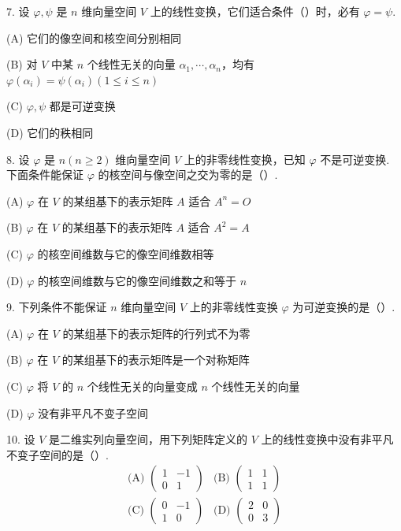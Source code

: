 \documentclass[UTF8, 12pt, fontset=fandol, oneside]{ctexart}
\begin{document}
7. 设 $\varphi,\psi$ 是 $n$ 维向量空间 $V$ 上的线性变换，它们适合条件（\quad）时，必有 $\varphi=\psi$.

(A) 它们的像空间和核空间分别相同

(B) 对 $V$ 中某 $n$ 个线性无关的向量 $\alpha_1,\cdots,\alpha_n$，均有 $\varphi(\alpha_i)=\psi(\alpha_i)(1\le i\le n)$

(C) $\varphi,\psi$ 都是可逆变换

(D) 它们的秩相同

8. 设 $\varphi$ 是 $n(n\ge2)$ 维向量空间 $V$ 上的非零线性变换，已知 $\varphi$ 不是可逆变换. 下面条件能保证 $\varphi$ 的核空间与像空间之交为零的是（\quad）.

(A) $\varphi$ 在 $V$ 的某组基下的表示矩阵 $A$ 适合 $A^n=O$

(B) $\varphi$ 在 $V$ 的某组基下的表示矩阵 $A$ 适合 $A^2=A$

(C) $\varphi$ 的核空间维数与它的像空间维数相等

(D) $\varphi$ 的核空间维数与它的像空间维数之和等于 $n$

9. 下列条件不能保证 $n$ 维向量空间 $V$ 上的非零线性变换 $\varphi$ 为可逆变换的是（\quad）.

(A) $\varphi$ 在 $V$ 的某组基下的表示矩阵的行列式不为零

(B) $\varphi$ 在 $V$ 的某组基下的表示矩阵是一个对称矩阵

(C) $\varphi$ 将 $V$ 的 $n$ 个线性无关的向量变成 $n$ 个线性无关的向量

(D) $\varphi$ 没有非平凡不变子空间

10. 设 $V$ 是二维实列向量空间，用下列矩阵定义的 $V$ 上的线性变换中没有非平凡不变子空间的是（\quad）.
\[
\begin{array}{ll}
\text{(A) }\left(\begin{array}{rr}1&-1\\0&1\end{array}\right)
&
\text{(B) }\left(\begin{array}{rr}1&1\\1&1\end{array}\right)
\\[1.2em]
\text{(C) }\left(\begin{array}{rr}0&-1\\1&0\end{array}\right)
&
\text{(D) }\left(\begin{array}{rr}2&0\\0&3\end{array}\right)
\end{array}
\]
\end{document}
